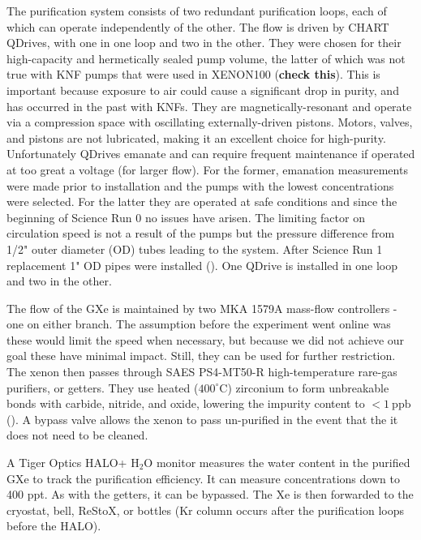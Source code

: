 The purification system consists of two redundant purification loops, each of which can operate independently of the other.  The flow
is driven by CHART QDrives, with one in one loop and two in the other.  They were chosen for their high-capacity and hermetically sealed
pump volume, the latter of which was not true with KNF pumps that were used in XENON100 (\textbf{check this}).  This is important because
exposure to air could cause a significant drop in purity, and has occurred in the past with KNFs.  They are
magnetically-resonant and operate via a compression space with oscillating externally-driven pistons.  Motors, valves, and pistons are
not lubricated, making it an excellent choice for high-purity.  Unfortunately QDrives emanate  and can require frequent
maintenance if operated at too great a voltage (for larger flow).  For the former,  emanation measurements were made prior to
installation and the pumps with the lowest concentrations were selected.  For the latter they are operated at safe conditions and since
the beginning of Science Run 0
no issues have arisen.  The limiting factor on circulation speed is not a result of the pumps but the pressure difference
from 1/2" outer diameter (OD) tubes leading to the system.  After Science Run 1 replacement 1" OD pipes were installed
().  One QDrive is installed in one loop and two in the other.

The flow of the GXe is maintained by two MKA 1579A mass-flow controllers - one on either branch.  The assumption before the experiment
went
online was these would limit the speed when necessary, but because we did not achieve our goal these have minimal impact.  Still, they can
be used for further restriction.  The xenon then passes through SAES PS4-MT50-R high-temperature rare-gas purifiers, or getters.  They
use heated ($400^{\circ}\mathrm{C}$) zirconium to form unbreakable bonds with carbide, nitride, and oxide, lowering the impurity content
to $< 1\ \mathrm{ppb}$ ().  A bypass valve allows the xenon to pass un-purified in the event that the it does not
need to be cleaned.

A Tiger Optics HALO+ H$_2$O monitor measures the water content in the purified GXe to track the purification efficiency.  It can measure
concentrations down to 400 ppt.  As with the getters, it can be bypassed.  The Xe is then forwarded to the cryostat, bell, ReStoX, or
bottles (Kr column occurs after the purification loops before the HALO).

